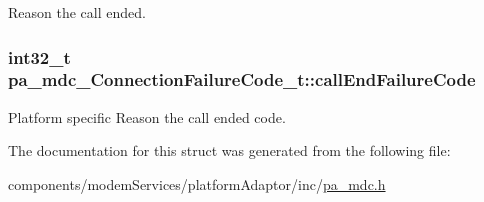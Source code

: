 Reason the call ended. 

\subsubsection[{\texorpdfstring{call\+End\+Failure\+Code}{callEndFailureCode}}]{\setlength{\rightskip}{0pt plus 5cm}int32\+\_\+t pa\+\_\+mdc\+\_\+\+Connection\+Failure\+Code\+\_\+t\+::call\+End\+Failure\+Code}\hypertarget{structpa__mdc___connection_failure_code__t_a751d08e6d71ad00e7b5704e7cfad3309}{}\label{structpa__mdc___connection_failure_code__t_a751d08e6d71ad00e7b5704e7cfad3309}


Platform specific Reason the call ended code. 



The documentation for this struct was generated from the following file\+:\begin{DoxyCompactItemize}
\item 
components/modem\+Services/platform\+Adaptor/inc/\hyperlink{pa__mdc_8h}{pa\+\_\+mdc.\+h}\end{DoxyCompactItemize}
